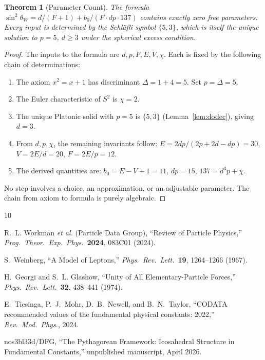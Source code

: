 \documentclass[11pt,a4paper]{article}
\theoremstyle{plain}
\newtheorem{theorem}{Theorem}[section]
\theoremstyle{definition}
\newcommand{\sw}{\sin^{2}\!\theta_{W}}
\begin{document}
\begin{theorem}[Parameter Count]\label{thm:params}
The formula $\sw = d/(F+1) + b_{0}/(F \cdot dp \cdot 137)$ contains
exactly zero free parameters.  Every input is determined by the
Schl\"{a}fli symbol $\{5, 3\}$, which is itself the unique solution
to $p = 5$, $d \ge 3$ under the spherical excess condition.
\end{theorem}

\begin{proof}
The inputs to the formula are $d, p, F, E, V, \chi$.  Each is fixed by
the following chain of determinations:

\begin{enumerate}[nosep]
  \item The axiom $x^{2} = x + 1$ has discriminant $\Delta = 1 + 4 = 5$.
    Set $p = \Delta = 5$.
  \item The Euler characteristic of $S^{2}$ is $\chi = 2$.
  \item The unique Platonic solid with $p = 5$ is $\{5,3\}$
    (Lemma~\ref{lem:dodec}), giving $d = 3$.
  \item From $d, p, \chi$, the remaining invariants follow:
    $E = 2dp/(2p + 2d - dp) = 30$, $V = 2E/d = 20$, $F = 2E/p = 12$.
  \item The derived quantities are:
    $b_{0} = E - V + 1 = 11$, $dp = 15$, $137 = d^{3}p + \chi$.
\end{enumerate}

No step involves a choice, an approximation, or an adjustable parameter.
The chain from axiom to formula is purely algebraic.
\end{proof}

\begin{thebibliography}{10}

R.~L. Workman \textit{et al.} (Particle Data Group),
``Review of Particle Physics,''
\textit{Prog.\ Theor.\ Exp.\ Phys.}\ \textbf{2024}, 083C01 (2024).

S.~Weinberg,
``A Model of Leptons,''
\textit{Phys.\ Rev.\ Lett.}\ \textbf{19}, 1264--1266 (1967).

H.~Georgi and S.~L. Glashow,
``Unity of All Elementary-Particle Forces,''
\textit{Phys.\ Rev.\ Lett.}\ \textbf{32}, 438--441 (1974).

E.~Tiesinga, P.~J.~Mohr, D.~B.~Newell, and B.~N.~Taylor,
``CODATA recommended values of the fundamental physical constants: 2022,''
\textit{Rev.\ Mod.\ Phys.}, 2024.

nos3bl33d/DFG,
``The Pythagorean Framework: Icosahedral Structure in Fundamental Constants,''
unpublished manuscript, April 2026.

\end{thebibliography}
\end{document}
